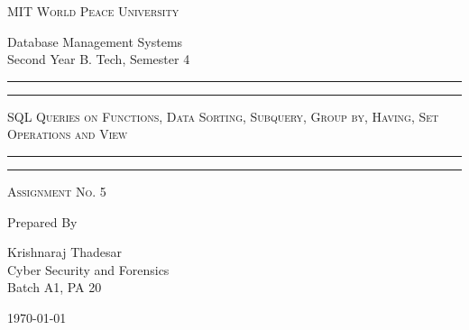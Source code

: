 \documentclass[11pt]{article}
\begin{document}
\begin{titlepage}
	\centering


	\huge\textsc{
		MIT World Peace University
	}\\

	\vspace{0.75\baselineskip} %

	\LARGE{
		Database Management Systems\\
		Second Year B. Tech, Semester 4
	}

	\vfill %


	\rule{\textwidth}{1.6pt}\vspace*{-\baselineskip}\vspace*{2pt}
	\rule{\textwidth}{0.6pt}
	\vspace{0.75\baselineskip} %



	\huge{\textsc{
        SQL Queries on Functions, Data Sorting, Subquery, Group by, Having, Set Operations and View
		}} \\



	\vspace{0.5\baselineskip} %
	\rule{\textwidth}{0.6pt}\vspace*{-\baselineskip}\vspace*{2.8pt}
	\rule{\textwidth}{1.6pt}

	\vspace{1\baselineskip} %


	\LARGE\textsc{
		Assignment No. 5
	} %
	\vfill


	Prepared By
	\vspace{0.5\baselineskip} %

	\Large{
		Krishnaraj Thadesar \\
		Cyber Security and Forensics\\
		Batch A1, PA 20
	}


	\vspace{0.5\baselineskip} %
	\today

\end{titlepage}
\end{document}
